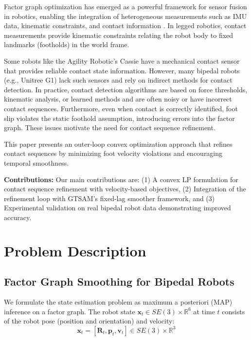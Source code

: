 \documentclass[conference]{IEEEtran}
\begin{document}
Factor graph optimization has emerged as a powerful framework for sensor fusion in robotics,
 enabling the integration of heterogeneous measurements such as IMU data, kinematic constraints,
  and contact information \cite{betts1998survey, hartley2018legged}. In legged robotics, contact 
  measurements provide kinematic constraints relating the robot body 
  to fixed landmarks (footholds) in the world frame.

Some robots like the Agility Robotic's Cassie 
have a mechanical contact sensor that provides reliable contact state information. However, many bipedal robots (e.g., Unitree G1) lack such sensors and rely on indirect methods for contact detection.
In practice, contact detection algorithms are based on force thresholds, kinematic analysis, or learned methods and are often noisy or  have incorrect contact sequences. Furthermore, even when contact is correctly identified, foot slip violates the static foothold assumption, introducing errors into the factor graph.
 These issues motivate the need for contact sequence refinement.

This paper presents an outer-loop convex optimization approach that refines
 contact sequences by minimizing foot velocity violations and encouraging temporal smoothness.

\textbf{Contributions:} Our main contributions are: (1) A convex LP formulation for contact sequence refinement with velocity-based objectives, (2) Integration of the refinement loop with GTSAM's fixed-lag smoother framework, and (3) Experimental validation on real bipedal robot data demonstrating improved accuracy.

\section{Problem Description}

\subsection{Factor Graph Smoothing for Bipedal Robots}
We formulate the state estimation problem as maximum a posteriori (MAP) inference on a factor graph. The robot state $\mathbf{x}_t \in SE(3) \times \mathbb{R}^6$ at time $t$ consists of the robot pose (position and orientation) and velocity:
\begin{equation}
\mathbf{x}_t = [\mathbf{R}_t, \mathbf{p}_t, \mathbf{v}_t] \in SE(3) \times \mathbb{R}^3
\end{equation}
\end{document}
